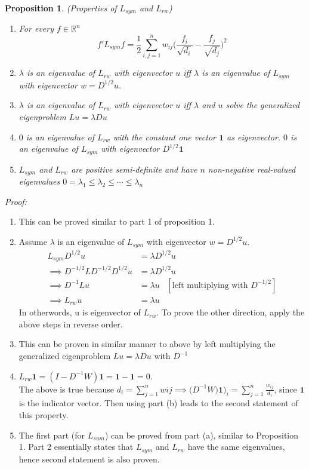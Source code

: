 \documentclass[10pt,a4paper, nocenter]{report}
\newtheorem{prop}{Proposition}
\begin{document}
    \begin{prop}
        (Properties of $L_{sym}$ and $L_{rw}$)
        \begin{enumerate}
            \item
            For every $f\in\mathbb{R}^{n}$
            $$ f'L_{sym}f = \frac{1}{2}\sum_{i,j=1}^{n}w_{ij}\bigg(\frac{f_{i}}{\sqrt{d_{i}}}-\frac{f_{j}}{\sqrt{d_{j}}}\bigg)^{2} $$
            \item $\lambda$ is an eigenvalue of $L_{rw}$ with eigenvector $u$ iff $\lambda$ is an eigenvalue of $L_{sym}$ with eigenvector $w=D^{1/2}u$.
            \item $\lambda$ is an eigenvalue of $L_{rw}$ with eigenvector $u$ iff $\lambda$ and $u$ solve the generalized eigenproblem $Lu=\lambda Du$
            \item $0$ is an eigenvalue of $L_{rw}$ with the constant one vector $\mathbf{1}$ as eigenvector. $0$ is an eigenvalue of $L_{sym}$ with eigenvector $D^{1/2}\mathbf{1}$
            \item $L_{sym}$ and $L_{rw}$ are positive semi-definite and have $n$ non-negative real-valued eigenvalues $0=\lambda_{1} \le \lambda_{2} \le \cdots \le \lambda_{n}$
        \end{enumerate}
    \end{prop}
    \textit{Proof:}
    \begin{enumerate}
        \item This can be proved similar to part 1 of proposition 1. 
        \item Assume $\lambda$ is an eigenvalue of $L_{sym}$ with eigenvector $w=D^{1/2}u$. 
        \begin{align*}
        L_{sym}D^{1/2}u &= \lambda D^{1/2}u \\
        \implies  D^{-1/2}LD^{-1/2}D^{1/2}u &= \lambda D^{1/2}u \\
        \implies D^{-1}Lu &= \lambda u \hspace{10pt}[\text{left multiplying with } D^{-1/2}] \\
        \implies L_{rw}u &= \lambda u
        \end{align*}
        In otherwords, u is eigenvector of $L_{rw}$. To prove the other direction, apply the above steps in reverse order.
        \item This can be proven in similar manner to above by left multiplying the generalized eigenproblem $Lu = \lambda Du$ with $D^{-1}$
        \item $L_{rw}\mathbf{1} = (I-D^{-1}W)\mathbf{1} = \mathbf{1}-\mathbf{1} = 0$.\\ The above is true because $d_{i} = \sum_{j=1}^{n}wij \implies \big(D^{-1}W)\mathbf{1}\big)_{i} = \sum_{j=1}^{n}\frac{w_{ij}}{d_{i}}$, since $\mathbf{1}$ is the indicator vector. Then using part (b) leads to the second statement of this property. 
        \item The first part (for $L_{sum}$) can be proved from part (a), similar to Proposition 1. Part 2 essentially states that $L_{sym}$ and $L_{rw}$ have the same eigenvalues, hence second statement is also proven.
    \end{enumerate}					
\end{document}
